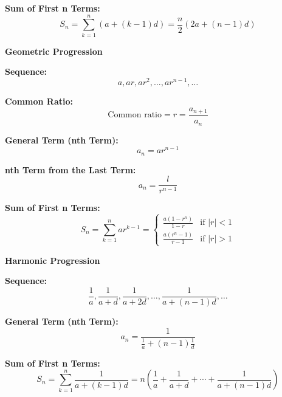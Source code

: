 \textbf{Sum of First n Terms:}
\[ S_n = \sum_{k=1}^{n} (a + (k-1)d) = \frac{n}{2} (2a + (n-1)d) \]

\vspace{0.5cm}

\textbf{Geometric Progression}

\textbf{Sequence:}
\[ a, ar, ar^2, \ldots, ar^{n-1}, \ldots \]

\textbf{Common Ratio:}
\[ \text{Common ratio} = r = \frac{a_{n+1}}{a_n} \]

\textbf{General Term (nth Term):}
\[ a_n = ar^{n-1} \]

\textbf{nth Term from the Last Term:}
\[ a_n = \frac{l}{r^{n-1}} \]

\textbf{Sum of First n Terms:}
\[ S_n = \sum_{k=1}^{n} ar^{k-1} = \begin{cases} 
\frac{a(1 - r^n)}{1 - r} & \text{if } |r| < 1 \\
\frac{a(r^n - 1)}{r - 1} & \text{if } |r| > 1 
\end{cases} \]

\vspace{0.5cm}

\textbf{Harmonic Progression}

\textbf{Sequence:}
\[ \frac{1}{a}, \frac{1}{a+d}, \frac{1}{a+2d}, \ldots, \frac{1}{a+(n-1)d}, \ldots \]

\textbf{General Term (nth Term):}
\[ a_n = \frac{1}{\frac{1}{a} + (n-1)\frac{1}{d}} \]

\textbf{Sum of First n Terms:}
\[ S_n = \sum_{k=1}^{n} \frac{1}{a + (k-1)d} = n \left(\frac{1}{a} + \frac{1}{a+d} + \cdots + \frac{1}{a+(n-1)d}\right) \]


